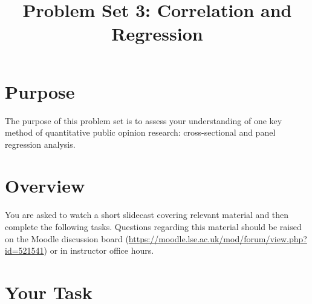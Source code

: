 \documentclass[a4paper]{exam}
\title{Problem Set 3: Correlation and Regression}
\date{}
\begin{document}
\vspace{-4em}
\maketitle

\section{Purpose}\label{purpose}

The purpose of this problem set is to assess your understanding of one key method of quantitative public opinion research: cross-sectional and panel regression analysis.

\section{Overview}\label{overview}

You are asked to watch a short slidecast covering relevant material and then complete the following tasks. Questions regarding this material should be raised on the Moodle discussion board (\url{https://moodle.lse.ac.uk/mod/forum/view.php?id=521541}) or in instructor office hours.

\section{Your Task}\label{your-task}
\end{document}
